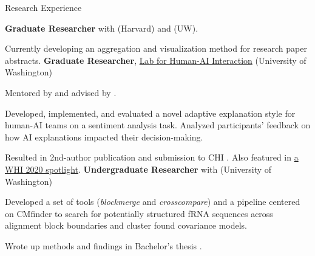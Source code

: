 \begin{rubric}{Research Experience}

	\textbf{Graduate Researcher} with \pGlassmanE{} (Harvard) and \pWeldD{} (UW).
	\par Currently developing an aggregation and visualization method for research paper abstracts.
	\textbf{Graduate Researcher}, \href{http://hai.cs.washington.edu}{Lab for Human-AI Interaction} (University of Washington)
	\par Mentored by \pBansalG{} and advised by \pWeldD{}.
	\par Developed, implemented, and evaluated a novel adaptive explanation style for human-AI teams on a sentiment analysis task. Analyzed participants' feedback on how AI explanations impacted their decision-making.
	\par Resulted in 2nd-author publication and submission to CHI \cite{bansal2020does}. Also featured in \href{https://sites.google.com/view/whi2020/home}{a WHI 2020 spotlight}.
\entry*[2018 -- 2019] %
    \textbf{Undergraduate Researcher} with \pRuzzoL{} (University of Washington)
    \par Developed a set of tools (\textit{blockmerge} and \textit{crosscompare}) and a pipeline centered on CMfinder to search for potentially structured fRNA sequences across alignment block boundaries and cluster found covariance models.
    \par Wrote up methods and findings in Bachelor's thesis \cite{zhou2019thesis}.
\end{rubric}